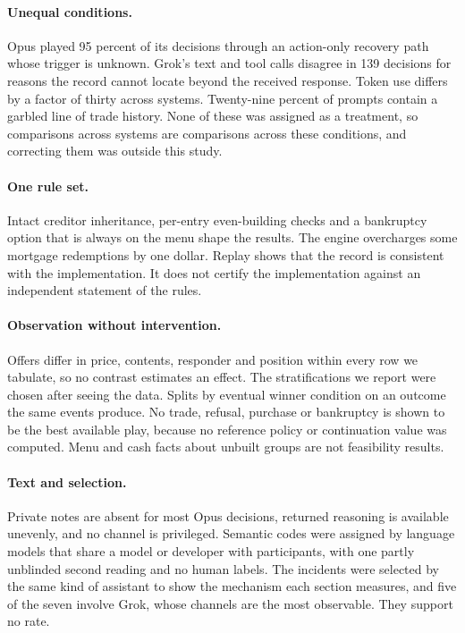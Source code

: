 \paragraph{Unequal conditions.} Opus played 95 percent of its decisions through an action-only recovery path whose trigger is unknown. Grok's text and tool calls disagree in 139 decisions for reasons the record cannot locate beyond the received response. Token use differs by a factor of thirty across systems. Twenty-nine percent of prompts contain a garbled line of trade history. None of these was assigned as a treatment, so comparisons across systems are comparisons across these conditions, and correcting them was outside this study.

\paragraph{One rule set.} Intact creditor inheritance, per-entry even-building checks and a bankruptcy option that is always on the menu shape the results. The engine overcharges some mortgage redemptions by one dollar. Replay shows that the record is consistent with the implementation. It does not certify the implementation against an independent statement of the rules.

\paragraph{Observation without intervention.} Offers differ in price, contents, responder and position within every row we tabulate, so no contrast estimates an effect. The stratifications we report were chosen after seeing the data. Splits by eventual winner condition on an outcome the same events produce. No trade, refusal, purchase or bankruptcy is shown to be the best available play, because no reference policy or continuation value was computed. Menu and cash facts about unbuilt groups are not feasibility results.

\paragraph{Text and selection.} Private notes are absent for most Opus decisions, returned reasoning is available unevenly, and no channel is privileged. Semantic codes were assigned by language models that share a model or developer with participants, with one partly unblinded second reading and no human labels. The incidents were selected by the same kind of assistant to show the mechanism each section measures, and five of the seven involve Grok, whose channels are the most observable. They support no rate.

